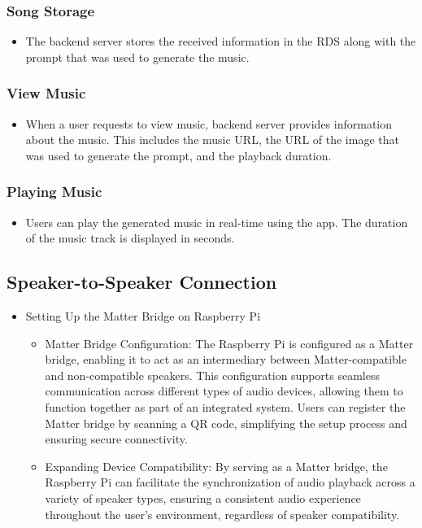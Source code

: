 \documentclass[conference]{IEEEtran}
\begin{document}
\subsubsection{Song Storage}
\begin{itemize}
    \item The backend server stores the received information in the RDS along with the prompt that was used to generate the music.\\
\end{itemize}

\subsubsection{View Music}
\begin{itemize}
    \item When a user requests to view music, backend server provides information about the music. This includes the music URL, the URL of the image that was used to generate the prompt, and the playback duration.\\
\end{itemize}

\subsubsection{Playing Music}
\begin{itemize}
    \item Users can play the generated music in real-time using the app. The duration of the music track is displayed in seconds.\\
\end{itemize}


\subsection{Speaker-to-Speaker Connection}
\begin{itemize}
    \item Setting Up the Matter Bridge on Raspberry Pi
\begin{itemize}
    \item Matter Bridge Configuration: The Raspberry Pi is configured as a Matter bridge, enabling it to act as an intermediary between Matter-compatible and non-compatible speakers. This configuration supports seamless communication across different types of audio devices, allowing them to function together as part of an integrated system. Users can register the Matter bridge by scanning a QR code, simplifying the setup process and ensuring secure connectivity.\\
    \item Expanding Device Compatibility: By serving as a Matter bridge, the Raspberry Pi can facilitate the synchronization of audio playback across a variety of speaker types, ensuring a consistent audio experience throughout the user’s environment, regardless of speaker compatibility.\\
\end{itemize}
\end{itemize}
\end{document}
